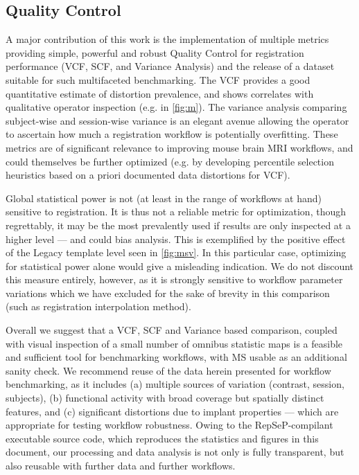 \subsection{Quality Control}

A major contribution of this work is the implementation of multiple metrics providing simple, powerful and robust Quality Control for registration performance (VCF, SCF, and Variance Analysis) and the release of a dataset suitable for such multifaceted benchmarking.
The VCF provides a good quantitative estimate of distortion prevalence, and shows correlates with qualitative operator inspection (e.g. in \cref{fig:m}).
The variance analysis comparing subject-wise and session-wise variance is an elegant avenue allowing the operator to ascertain how much a registration workflow is potentially overfitting.
These metrics are of significant relevance to improving mouse brain MRI workflows, and could themselves be further optimized (e.g. by developing percentile selection heuristics based on a priori documented data distortions for VCF).

Global statistical power is not (at least in the range of workflows at hand) sensitive to registration.
It is thus not a reliable metric for optimization, though regrettably, it may be the most prevalently used if results are only inspected at a higher level --- and could bias analysis.
This is exemplified by the positive effect of the Legacy template level seen in \cref{fig:msv}.
In this particular case, optimizing for statistical power alone would give a misleading indication.
We do not discount this measure entirely, however, as it is strongly sensitive to workflow parameter variations which we have excluded for the sake of brevity in this comparison (such as registration interpolation method).

Overall we suggest that a VCF, SCF and Variance based comparison, coupled with visual inspection of a small number of omnibus statistic maps is a feasible and sufficient tool for benchmarking workflows, with MS usable as an additional sanity check.
We recommend reuse of the data herein presented for workflow benchmarking, as it includes (a) multiple sources of variation (contrast, session, subjects), (b) functional activity with broad coverage but spatially distinct features, and (c) significant distortions due to implant properties --- which are appropriate for testing workflow robustness.
Owing to the RepSeP-compilant executable source code, which reproduces the statistics and figures in this document, our processing and data analysis is not only is fully transparent, but also reusable with further data and further workflows.

